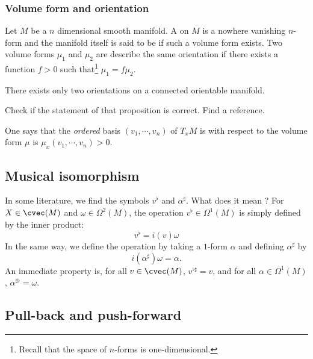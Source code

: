 \subsubsection{Volume form and orientation}

Let $M$ be a $n$ dimensional smooth manifold. A  on $M$ is a nowhere vanishing $n$-form and the manifold itself is said to be  if such a volume form exists. Two volume forms $\mu_1$ and $\mu_2$ are describe the same orientation if there exists a function $f>0$ such that\footnote{Recall that the space of $n$-forms is one-dimensional.} $\mu_1=f\mu_2$.

\begin{proposition}
There exists only two orientations on a connected orientable manifold.
\end{proposition}
\begin{probleme}
    Check if the statement of that proposition is correct. Find a reference.
\end{probleme}

One says that the \emph{ordered} basis $(v_1,\cdots,v_n)$ of $T_xM$ is  with respect to the volume form $\mu$ is $\mu_x(v_1,\cdots,v_n)>0$.

\subsection{Musical isomorphism}\label{subsec_musique}

In some literature, we find the symbols $v^{\flat}$ and $\alpha^{\sharp}$. What does it mean ? For $X\in\cvec(M)$ and $\omega\in\Omega^2(M)$, the  operation $v^{\flat}\in\Omega^1(M)$ is simply defined by the inner product:
\begin{equation}        \label{EQooBTWXooTqoNxa}
  v^{\flat}=i(v)\omega
\end{equation}
 In the same way, we define the  operation by taking a $1$-form $\alpha$ and defining $\alpha^{\sharp}$ by
\begin{equation}
   i(\alpha^{\sharp})\omega=\alpha.
\end{equation}
An immediate property is, for all $v\in\cvec(M)$, $v^{\flat\sharp}=v$, and for all $\alpha\in\Omega^1(M)$, $\alpha^{\sharp\flat}=\omega$.

\subsection{Pull-back and push-forward}

